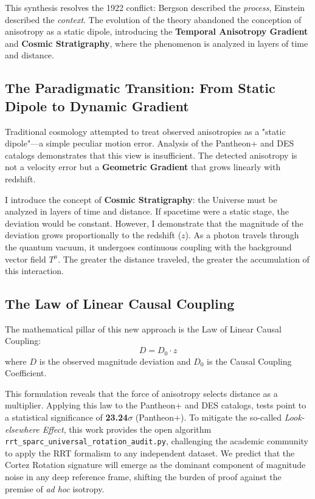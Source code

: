\documentclass[12pt,a4paper]{article}
\begin{document}
This synthesis resolves the 1922 conflict: Bergson described the \textit{process}, Einstein described the \textit{context}. The evolution of the theory abandoned the conception of anisotropy as a static dipole, introducing the \textbf{Temporal Anisotropy Gradient} and \textbf{Cosmic Stratigraphy}, where the phenomenon is analyzed in layers of time and distance.

\subsection{The Paradigmatic Transition: From Static Dipole to Dynamic Gradient}
Traditional cosmology attempted to treat observed anisotropies as a "static dipole"—a simple peculiar motion error. Analysis of the Pantheon+ and DES catalogs demonstrates that this view is insufficient. The detected anisotropy is not a velocity error but a \textbf{Geometric Gradient} that grows linearly with redshift.

I introduce the concept of \textbf{Cosmic Stratigraphy}: the Universe must be analyzed in layers of time and distance. If spacetime were a static stage, the deviation would be constant. However, I demonstrate that the magnitude of the deviation grows proportionally to the redshift ($z$). As a photon travels through the quantum vacuum, it undergoes continuous coupling with the background vector field $T^\mu$. The greater the distance traveled, the greater the accumulation of this interaction.

\subsection{The Law of Linear Causal Coupling}
The mathematical pillar of this new approach is the Law of Linear Causal Coupling:
\begin{equation}
    D = D_0 \cdot z
\end{equation}
where $D$ is the observed magnitude deviation and $D_0$ is the Causal Coupling Coefficient.

This formulation reveals that the force of anisotropy selects distance as a multiplier. Applying this law to the Pantheon+ and DES catalogs, tests point to a statistical significance of \textbf{23.24$\sigma$} (Pantheon+). To mitigate the so-called \textit{Look-elsewhere Effect}, this work provides the open algorithm \texttt{rrt\_sparc\_universal\_rotation\_audit.py}, challenging the academic community to apply the RRT formalism to any independent dataset. We predict that the Cortez Rotation signature will emerge as the dominant component of magnitude noise in any deep reference frame, shifting the burden of proof against the premise of \textit{ad hoc} isotropy.
\end{document}
